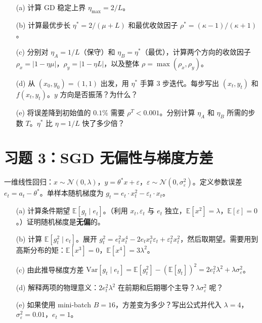 \documentclass[12pt, a4paper]{ctexart}
\begin{document}
\begin{enumerate}
    \item[(a)] 计算 GD 稳定上界 $\eta_{\max} = 2/L$。
    
    \item[(b)] 计算最优步长 $\eta^* = 2/(\mu + L)$ 和最优收敛因子 $\rho^* = (\kappa-1)/(\kappa+1)$。
    
    \item[(c)] 分别对 $\eta_A = 1/L$（保守）和 $\eta_B = \eta^*$（最优），计算两个方向的收敛因子 $\rho_x = |1-\eta\mu|$，$\rho_y = |1-\eta L|$，以及整体 $\rho = \max(\rho_x, \rho_y)$。
    
    \item[(d)] 从 $(x_0, y_0) = (1, 1)$ 出发，用 $\eta^*$ 手算 3 步迭代。每步写出 $(x_t, y_t)$ 和 $f(x_t, y_t)$。$y$ 方向是否振荡？为什么？
    
    \item[(e)] 将误差降到初始值的 $0.1\%$ 需要 $\rho^T < 0.001$。分别计算 $\eta_A$ 和 $\eta_B$ 所需的步数 $T$。$\eta^*$ 比 $\eta = 1/L$ 快了多少倍？
\end{enumerate}


\section*{习题 3：SGD 无偏性与梯度方差}

一维线性回归：$x \sim \mathcal{N}(0, \lambda)$，$y = \theta^* x + \varepsilon$，$\varepsilon \sim \mathcal{N}(0, \sigma_\varepsilon^2)$。定义参数误差 $e_t = a_t - \theta^*$。单样本随机梯度为 $g_t = e_t \cdot x_t^2 - \varepsilon_t \cdot x_t$。

\begin{enumerate}
    \item[(a)] 计算条件期望 $\mathbb{E}[g_t \mid e_t]$。（利用 $x_t, \varepsilon_t$ 与 $e_t$ 独立，$\mathbb{E}[x^2] = \lambda$，$\mathbb{E}[\varepsilon] = 0$。）证明随机梯度是\textbf{无偏}的。
    
    \item[(b)] 计算 $\mathbb{E}[g_t^2 \mid e_t]$。展开 $g_t^2 = e_t^2 x_t^4 - 2e_t x_t^3 \varepsilon_t + \varepsilon_t^2 x_t^2$，然后取期望。需要用到高斯分布的矩：$\mathbb{E}[x^3] = 0$，$\mathbb{E}[x^4] = 3\lambda^2$。
    
    \item[(c)] 由此推导梯度方差 $\text{Var}[g_t \mid e_t] = \mathbb{E}[g_t^2] - (\mathbb{E}[g_t])^2 = 2e_t^2\lambda^2 + \lambda\sigma_\varepsilon^2$。
    
    \item[(d)] 解释两项的物理意义：$2e_t^2\lambda^2$ 在前期和后期哪个主导？$\lambda\sigma_\varepsilon^2$ 呢？
    
    \item[(e)] 如果使用 mini-batch $B = 16$，方差变为多少？写出公式并代入 $\lambda = 4$，$\sigma_\varepsilon^2 = 0.01$，$e_t = 1$。
\end{enumerate}
\end{document}
